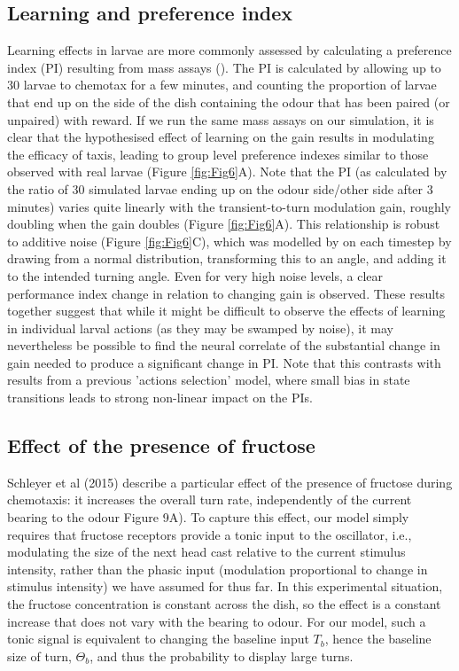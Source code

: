 \documentclass[10pt,a4paper]{article}
\begin{document}
\subsection{Learning and preference index}
Learning effects in larvae are more commonly assessed by calculating a preference index (PI) resulting from mass assays (\citep{gerber2009smelling}). The PI is calculated by allowing up to 30 larvae to chemotax for a few minutes, and counting the proportion of larvae that end up on the side of the dish containing the odour that has been paired (or unpaired) with reward. If we run the same mass assays on our simulation, it is clear that the hypothesised effect of learning on the gain results in modulating the efficacy of taxis, leading to group level preference indexes similar to those observed with real larvae (Figure \ref{fig:Fig6}A). Note that the PI (as calculated by the ratio of 30 simulated larvae ending up on the odour side/other side after 3 minutes) varies quite linearly with the transient-to-turn modulation gain, roughly doubling when the gain doubles (Figure \ref{fig:Fig6}A). This relationship is robust to additive noise (Figure \ref{fig:Fig6}C), which was modelled by on each timestep by drawing from a normal distribution, transforming this to an angle, and adding it to the intended turning angle. Even for very high noise levels, a clear performance index change in relation to changing gain is observed. These results together suggest that while it might be difficult to observe the effects of learning in individual larval actions (as they may be swamped by noise), it may nevertheless be possible to find the neural correlate of the substantial change in gain needed to produce a significant change in PI.
Note that this contrasts with results from a previous 'actions selection' model, where small bias in state transitions leads to strong non-linear impact on the PIs.

\subsection{Effect of the presence of fructose}
Schleyer et al (2015) describe a particular effect of the presence of fructose during chemotaxis: it increases the overall turn rate, independently of the current bearing to the odour Figure 9A). To capture this effect, our model simply requires that fructose receptors provide a tonic input to the oscillator, i.e., modulating the size of the next head cast relative to the current stimulus intensity, rather than the phasic input (modulation proportional to change in stimulus intensity) we have assumed for thus far. In this experimental situation, the fructose concentration is constant across the dish, so the effect is a constant increase that does not vary with the bearing to odour. For our model, such a tonic signal is equivalent to changing the baseline input $T_b$, hence the baseline size of turn, $\Theta_b$, and thus the probability to display large turns. 
\end{document}
